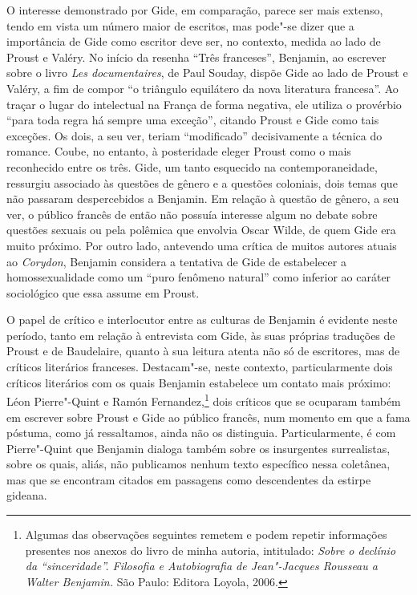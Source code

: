 O interesse demonstrado por Gide, em comparação, parece ser mais
extenso, tendo em vista um número maior de escritos, mas pode"-se dizer
que a importância de Gide como escritor deve ser, no contexto, medida ao lado de
Proust e Valéry. No início da resenha ``Três franceses'', Benjamin, ao
escrever sobre o livro \emph{Les documentaires}, de Paul Souday, dispõe
Gide ao lado de Proust e Valéry, a fim de compor ``o triângulo
equilátero da nova literatura francesa''. Ao traçar o lugar do
intelectual na França de forma negativa, ele utiliza o provérbio ``para
toda regra há sempre uma exceção'', citando Proust e Gide como tais
exceções. Os dois, a seu ver, teriam ``modificado'' decisivamente a
técnica do romance. Coube, no entanto, à posteridade eleger Proust como o mais
reconhecido entre os três. Gide, um tanto esquecido na
contemporaneidade, ressurgiu associado às questões de gênero e a
questões coloniais, dois temas que não passaram despercebidos a
Benjamin. Em relação à questão de gênero, a seu ver, o público francês de então
não possuía interesse algum no debate sobre questões sexuais ou pela
polêmica que envolvia Oscar Wilde, de quem Gide era muito próximo. Por
outro lado, antevendo uma crítica de muitos autores atuais ao
\emph{Corydon}, Benjamin considera a tentativa de Gide de estabelecer a
homossexualidade como um ``puro fenômeno natural'' como inferior ao
caráter sociológico que essa assume em Proust.

O papel de crítico e interlocutor entre as culturas de Benjamin é
evidente neste período, tanto em relação à entrevista com Gide, às suas
próprias traduções de Proust e de Baudelaire, quanto à sua leitura
atenta não só de escritores, mas de críticos literários franceses. Destacam"-se, neste
contexto, particularmente dois críticos literários com os quais Benjamin
estabelece um contato mais próximo: Léon Pierre"-Quint e Ramón Fernandez,\footnote{Algumas das observações seguintes remetem e podem repetir
  informações presentes nos anexos do livro de minha autoria,
  intitulado: \emph{Sobre o declínio da ``sinceridade''. Filosofia e
  Autobiografia de Jean"-Jacques Rousseau a Walter Benjamin.} São Paulo:
  Editora Loyola, 2006.} dois críticos que se ocuparam também em
escrever sobre Proust e Gide ao público francês, num momento em que a
fama póstuma, como já ressaltamos, ainda não os distinguia.
Particularmente, é com Pierre"-Quint que Benjamin dialoga também sobre os
insurgentes surrealistas, sobre os quais, aliás, não publicamos nenhum
texto específico nessa coletânea, mas que se encontram citados em
passagens como descendentes da estirpe gideana.

